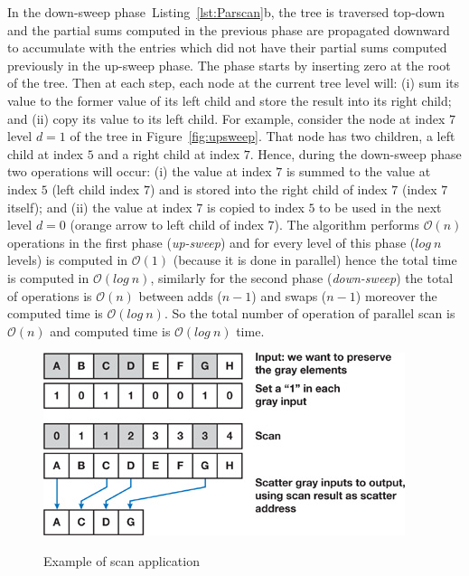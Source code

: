 \documentclass[Ingles]{ic-tese-v1}
\newcommand{\rfig}[1]{Figure~\ref{fig:#1}}
\newcommand{\rlsts}[2]{Listing~\ref{lst:#1}{#2}}
\begin{document}
In  the down-sweep  phase~\rlsts{Parscan}{b},  the  tree is  traversed
top-down and  the partial sums computed in the previous phase are propagated
downward to accumulate  with the  entries which  did not  have their  partial
sums computed  previously  in the  up-sweep  phase.   The phase  starts  by
inserting zero at the  root of the tree. Then at  each step, each node at the
current tree level will: (i)  sum its value to the former value of its left
child and store the  result into its right child; and (ii) copy its value
to its  left child.  For example, consider the node at index $7$  level $d = 1$
of the tree in  \rfig{upsweep}. That node has two children, a left child at
index $5$ and a right child at index $7$.  Hence,  during the down-sweep  phase
two operations  will occur: (i) the value at  index $7$ is summed to the value
at index $5$ (left child index  $7$) and is stored  into the right child  of
index $7$ (index $7$ itself); and (ii) the value at index $7$ is copied to
index $5$ to be used  in the next level $d = 0$ (orange  arrow to left child of
index $7$). The algorithm  performs $\mathcal{O}(n)$ operations in the first
phase (\textit{up-sweep}) and for every level of this phase ($log\ n $ levels)
is computed in $\mathcal{O}(1)$ (because it is done in parallel) hence the total
time is computed in $\mathcal{O}(log\ n)$, similarly for the second phase
(\textit{down-sweep}) the total of operations is $\mathcal{O}(n)$ between adds
($n-1$) and swaps ($n-1$) moreover the computed time is $\mathcal{O}(log\ n)$.
So the total number of operation of parallel scan is $\mathcal{O}(n)$ and
computed time is $\mathcal{O}(log\ n)$ time.

\begin{figure}[t]
	\centering
	\caption{Example of scan application}
	\includegraphics[scale=1.0]{images/desireElements.jpg}
	\label{fig:desire}
\end{figure}
\end{document}
